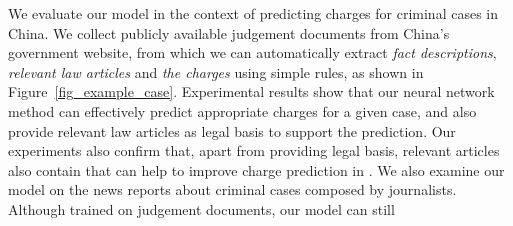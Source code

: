 We evaluate our model in the context of  predicting charges for criminal cases in China. 
We collect publicly available judgement documents from China's government website, 
from which we can automatically extract 
\textit{fact descriptions}, \textit{relevant law articles} and \textit{the charges} using simple rules, as shown in Figure~\ref{fig_example_case}.
Experimental results show that our neural network method can effectively predict appropriate charges for a given case, and also provide relevant law articles as legal basis to support the prediction. Our experiments also confirm that, apart from providing legal basis, relevant articles also contain  that can help to improve charge prediction in .
We also examine our model on the news reports about criminal cases composed by journalists.
Although trained on judgement documents, our model can still 




